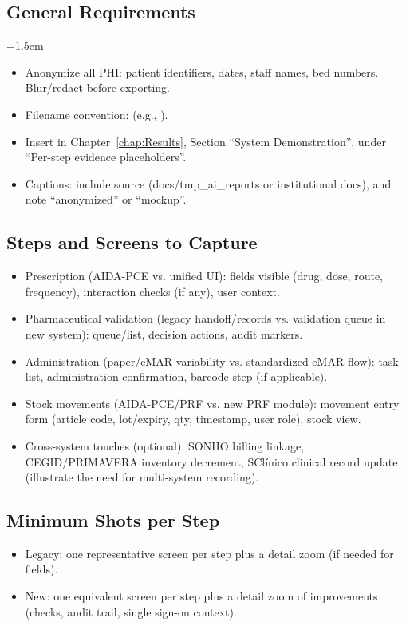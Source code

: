 \subsection*{General Requirements}
\begingroup\emergencystretch=1.5em
\begin{itemize}
    \item Anonymize all PHI: patient identifiers, dates, staff names, bed numbers. Blur/redact before exporting.
    \item Filename convention: \texttt{} (e.g., \texttt{}).
    \item Insert in Chapter~\ref{chap:Results}, Section ``System Demonstration'', under ``Per-step evidence placeholders''.
    \item Captions: include source (docs/tmp\_ai\_reports or institutional docs), and note \textquotedblleft anonymized\textquotedblright{} or \textquotedblleft mockup\textquotedblright{}.
\end{itemize}
\endgroup

\subsection*{Steps and Screens to Capture}
\begin{itemize}
    \item Prescription (AIDA-PCE vs. unified UI): fields visible (drug, dose, route, frequency), interaction checks (if any), user context.
    \item Pharmaceutical validation (legacy handoff/records vs. validation queue in new system): queue/list, decision actions, audit markers.
    \item Administration (paper/eMAR variability vs. standardized eMAR flow): task list, administration confirmation, barcode step (if applicable).
    \item Stock movements (AIDA-PCE/PRF vs. new PRF module): movement entry form (article code, lot/expiry, qty, timestamp, user role), stock view.
    \item Cross-system touches (optional): SONHO billing linkage, CEGID/PRIMAVERA inventory decrement, SClínico clinical record update (illustrate the need for multi-system recording).
\end{itemize}

\subsection*{Minimum Shots per Step}
\begin{itemize}
    \item Legacy: one representative screen per step plus a detail zoom (if needed for fields).
    \item New: one equivalent screen per step plus a detail zoom of improvements (checks, audit trail, single sign-on context).
\end{itemize}

